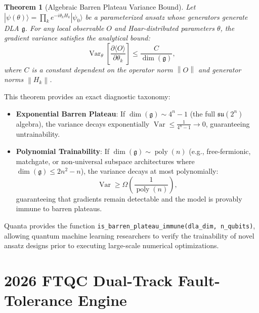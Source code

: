 \documentclass[aps,prx,twocolumn,superscriptaddress,nofootinbib]{revtex4-2}
\newcommand{\ket}[1]{|#1\rangle}
\newcommand{\norm}[1]{\left\|#1\right\|}
\newcommand{\Var}{\operatorname{Var}}
\newtheorem{theorem}{Theorem}
\begin{document}
\begin{theorem}[Algebraic Barren Plateau Variance Bound]
Let $\ket{\psi(\theta)} = \prod_k e^{-i \theta_k H_k} \ket{\psi_0}$ be a parameterized ansatz whose generators generate DLA $\mathfrak{g}$. For any local observable $O$ and Haar-distributed parameters $\theta$, the gradient variance satisfies the analytical bound:
\begin{equation}
    \Var_\theta \left[ \frac{\partial \langle O \rangle}{\partial \theta_k} \right] \le \frac{C}{\dim(\mathfrak{g})},
\end{equation}
where $C$ is a constant dependent on the operator norm $\norm{O}$ and generator norms $\norm{H_k}$.
\end{theorem}

This theorem provides an exact diagnostic taxonomy:
\begin{itemize}
    \item \textbf{Exponential Barren Plateau}: If $\dim(\mathfrak{g}) \sim 4^n - 1$ (the full $\mathfrak{su}(2^n)$ algebra), the variance decays exponentially $\Var \le \frac{1}{4^n - 1} \to 0$, guaranteeing untrainability.
    \item \textbf{Polynomial Trainability}: If $\dim(\mathfrak{g}) \sim \operatorname{poly}(n)$ (e.g., free-fermionic, matchgate, or non-universal subspace architectures where $\dim(\mathfrak{g}) \le 2n^2 - n$), the variance decays at most polynomially:
    \begin{equation}
        \Var \ge \Omega\left(\frac{1}{\operatorname{poly}(n)}\right),
    \end{equation}
    guaranteeing that gradients remain detectable and the model is provably immune to barren plateaus.
\end{itemize}

Quanta provides the function \texttt{is\_barren\_plateau\_immune(dla\_dim, n\_qubits)}, allowing quantum machine learning researchers to verify the trainability of novel ansatz designs prior to executing large-scale numerical optimizations.

\section{2026 FTQC Dual-Track Fault-Tolerance Engine}
\label{sec:ftqc_dual_track}
\end{document}
